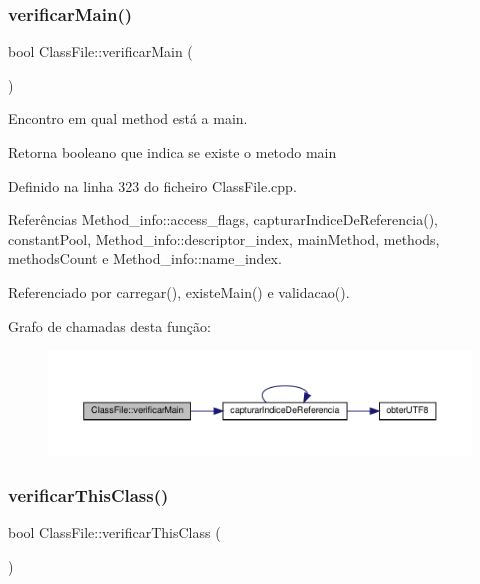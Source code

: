\subsubsection{\texorpdfstring{verificar\+Main()}{verificarMain()}}
{\footnotesize\ttfamily bool Class\+File\+::verificar\+Main (\begin{DoxyParamCaption}{ }\end{DoxyParamCaption})\hspace{0.3cm}{\ttfamily [private]}}



Encontro em qual method está a main. 

\begin{DoxyReturn}{Retorna}
booleano que indica se existe o metodo main 
\end{DoxyReturn}


Definido na linha 323 do ficheiro Class\+File.\+cpp.



Referências Method\+\_\+info\+::access\+\_\+flags, capturar\+Indice\+De\+Referencia(), constant\+Pool, Method\+\_\+info\+::descriptor\+\_\+index, main\+Method, methods, methods\+Count e Method\+\_\+info\+::name\+\_\+index.



Referenciado por carregar(), existe\+Main() e validacao().

Grafo de chamadas desta função\+:
\nopagebreak
\begin{figure}[H]
\begin{center}
\leavevmode
\includegraphics[width=350pt]{classClassFile_ae8e4445e763c4ee7c04995fcea0369e0_cgraph}
\end{center}
\end{figure}
\mbox{\label{classClassFile_a6b8f23db0ee4af80a2e75d46a191dc20}} 
\subsubsection{\texorpdfstring{verificar\+This\+Class()}{verificarThisClass()}}
{\footnotesize\ttfamily bool Class\+File\+::verificar\+This\+Class (\begin{DoxyParamCaption}{ }\end{DoxyParamCaption})}



